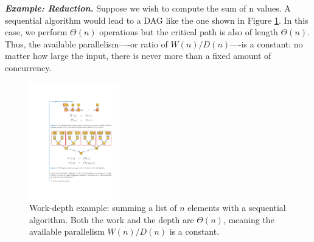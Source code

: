 \documentclass[twocolumn]{article}
\begin{document}
\noindent
\textit{\textbf{Example: Reduction.}} 
Suppose we wish to compute the sum of n values. A sequential algorithm would lead to a DAG like the one shown in Figure \ref{fig:worker-depth-example}. 
In this case, we perform $\Theta(n)$ operations but the critical path is also of length $\Theta(n)$. 
Thus, the available parallelism—-or ratio of $W (n)/D(n)$—-is a constant: no matter how large the input, there is never more than a fixed amount of concurrency.
\begin{figure}[htb]
        \centering
        \includegraphics[width=0.35\textwidth]{work-depth-example.pdf}
        \caption{Work-depth example: summing a list of $n$ elements with a sequential algorithm. Both the work and the depth are $\Theta(n)$, meaning the available parallelism $W (n)/D(n)$ is a constant.}
        \label{fig:worker-depth-example}
\end{figure}
\end{document}
